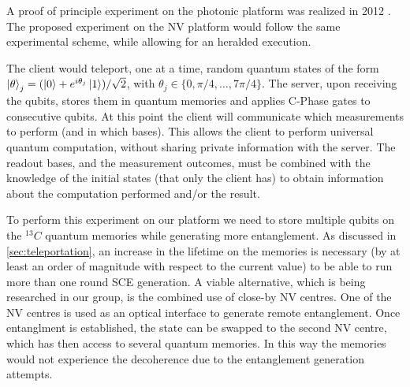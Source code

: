 \documentclass[a4paper, twoside]{article}
\begin{document}
A proof of principle experiment on the photonic platform was realized in 2012 \cite{Barz2012}. The proposed experiment on the NV platform would follow the same experimental scheme, while allowing for an heralded execution.

The client would teleport, one at a time, random quantum states of the form $\ket\theta_j = (\ket 0 + e^{i \theta_j}\ket 1)/\sqrt 2$, with $\theta_j \in \lbrace0, \pi/4,\ldots,7\pi/4\rbrace$. The server, upon receiving the qubits, stores them in quantum memories and applies C-Phase gates to consecutive qubits.
At this point the client will communicate which measurements to perform (and in which bases). This allows the client to perform universal quantum computation, without sharing private information with the server. The readout bases, and the measurement outcomes, must be combined with the knowledge of the initial states (that only the client has) to obtain information about the computation performed and/or the result.

To perform this experiment on our platform we need to store multiple qubits on the ${}^{13}C$ quantum memories while generating more entanglement. As discussed in \autoref{sec:teleportation}, an increase in the lifetime on the memories is necessary (by at least an order of magnitude with respect to the current value) to be able to run more than one round \ac{SCE} generation. 
A viable alternative, which is being researched in our group, is the combined use of close-by NV centres. One of the NV centres is used as an optical interface to generate remote entanglement. Once entanglment is established, the state can be swapped to the second NV centre, which has then access to several quantum memories. In this way the memories would not experience the decoherence due to the entanglement generation attempts.
\end{document}
